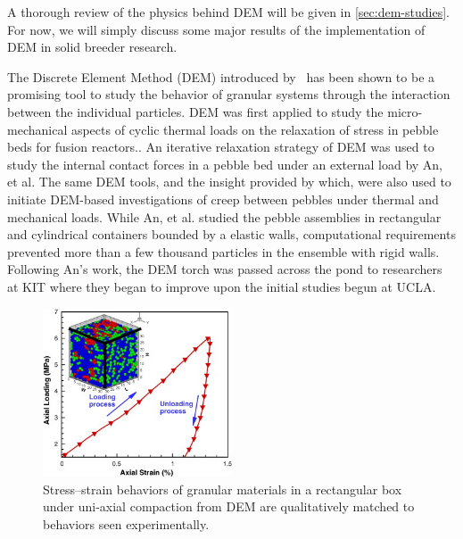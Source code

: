 A thorough review of the physics behind DEM will be given in \cref{sec:dem-studies}. For now, we will simply discuss some major results of the implementation of DEM in solid breeder research.

The Discrete Element Method (DEM) introduced by~\cite{Cundall1979} has been shown to be a promising tool to study the behavior of granular systems through the interaction between the individual particles. DEM was first applied to study the micro-mechanical aspects of cyclic thermal loads on the relaxation of stress in pebble beds for fusion reactors.\cite{Lu2000b,Ying2002}. An iterative relaxation strategy of DEM was used to study the internal contact forces in a pebble bed under an external load by An, et al.\cite{An20072233} The same DEM tools, and the insight provided by which, were also used to initiate DEM-based investigations of creep between pebbles under thermal and mechanical loads.\cite{An20071393} While An, et al. studied the pebble assemblies in rectangular and cylindrical containers bounded by a elastic walls, computational requirements prevented more than a few thousand particles in the ensemble with rigid walls.\cite{An20072233} Following An's work, the DEM torch was passed across the pond to researchers at KIT where they began to improve upon the initial studies begun at UCLA.

\begin{figure}[!h]
	\centering
	\includegraphics[width=0.5\textwidth]{chapters/figures/1-s2.0-S092037960700049X-gr1.jpg}
	\caption{Stress–strain behaviors of granular materials in a rectangular box under uni-axial compaction from DEM are qualitatively matched to behaviors seen experimentally.}
\label{fig:an-uniaxial-compression}
\end{figure}

